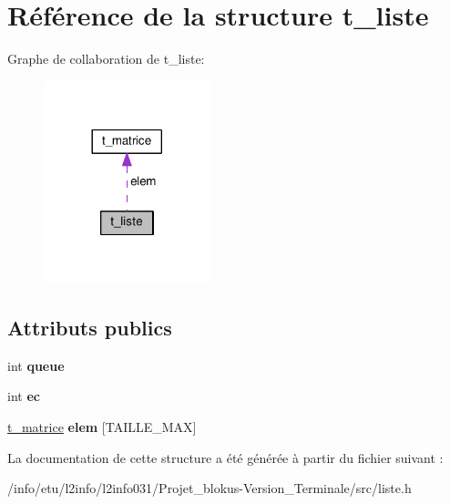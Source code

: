 \hypertarget{structt__liste}{}\section{Référence de la structure t\+\_\+liste}
\label{structt__liste}


Graphe de collaboration de t\+\_\+liste\+:\nopagebreak
\begin{figure}[H]
\begin{center}
\leavevmode
\includegraphics[width=137pt]{structt__liste__coll__graph}
\end{center}
\end{figure}
\subsection*{Attributs publics}
\begin{DoxyCompactItemize}
\item 
int {\bfseries queue}\hypertarget{structt__liste_a4490eb6055dcac86850cb786fb82bde1}{}\label{structt__liste_a4490eb6055dcac86850cb786fb82bde1}

\item 
int {\bfseries ec}\hypertarget{structt__liste_a29d2b9847ad3ab87a33e5d1f6a1452d3}{}\label{structt__liste_a29d2b9847ad3ab87a33e5d1f6a1452d3}

\item 
\hyperlink{structt__matrice}{t\+\_\+matrice} {\bfseries elem} \mbox{[}T\+A\+I\+L\+L\+E\+\_\+\+M\+AX\mbox{]}\hypertarget{structt__liste_af85442e24b947c7ebbf2aeadf6f8c20c}{}\label{structt__liste_af85442e24b947c7ebbf2aeadf6f8c20c}

\end{DoxyCompactItemize}


La documentation de cette structure a été générée à partir du fichier suivant \+:\begin{DoxyCompactItemize}
\item 
/info/etu/l2info/l2info031/\+Projet\+\_\+blokus-\/\+Version\+\_\+\+Terminale/src/liste.\+h\end{DoxyCompactItemize}
